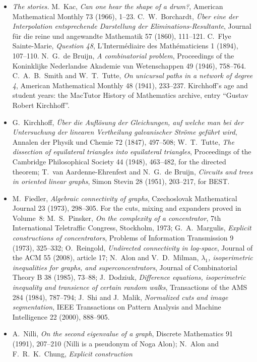 \begin{itemize}
\item \emph{The stories.} M.~Kac, \emph{Can one hear the shape of a drum?}, American Mathematical Monthly 73 (1966), 1--23. C.~W.~Borchardt, \emph{\"Uber eine der Interpolation entsprechende Darstellung der Eliminations-Resultante}, Journal f\"ur die reine und angewandte Mathematik 57 (1860), 111--121. C.~Flye Sainte-Marie, \emph{Question 48}, L'Interm\'ediaire des Math\'ematiciens 1 (1894), 107--110. N.~G.~de Bruijn, \emph{A combinatorial problem}, Proceedings of the Koninklijke Nederlandse Akademie van Wetenschappen 49 (1946), 758--764. C.~A.~B.~Smith and W.~T.~Tutte, \emph{On unicursal paths in a network of degree 4}, American Mathematical Monthly 48 (1941), 233--237. Kirchhoff's age and student years: the MacTutor History of Mathematics archive, entry ``Gustav Robert Kirchhoff''.
\item G.~Kirchhoff, \emph{\"Uber die Aufl\"osung der Gleichungen, auf welche man bei der Untersuchung der linearen Vertheilung galvanischer Str\"ome gef\"uhrt wird}, Annalen der Physik
und Chemie 72 (1847), 497--508; W.~T.~Tutte, \emph{The dissection of equilateral triangles into equilateral triangles}, Proceedings of the Cambridge Philosophical Society 44 (1948),
463--482, for the directed theorem; T.~van Aardenne-Ehrenfest and N.~G.~de Bruijn, \emph{Circuits and trees in oriented linear graphs}, Simon Stevin 28 (1951), 203--217, for BEST.
\item M.~Fiedler, \emph{Algebraic connectivity of graphs}, Czechoslovak Mathematical Journal 23 (1973), 298--305. For the cuts, mixing and expanders proved in Volume~8: M.~S.~Pinsker, \emph{On the complexity of a concentrator}, 7th International Teletraffic Congress, Stockholm, 1973; G.~A.~Margulis, \emph{Explicit constructions of
concentrators}, Problems of Information Transmission 9 (1973), 325--332; O.~Reingold, \emph{Undirected connectivity in log-space}, Journal of the ACM 55 (2008), article 17; N.~Alon and V.~D.~Milman, \emph{$\lambda_1$, isoperimetric inequalities for graphs, and
superconcentrators}, Journal of Combinatorial Theory B 38 (1985), 73--88; J.~Dodziuk, \emph{Difference equations, isoperimetric inequality and transience of certain random walks}, Transactions
of the AMS 284 (1984), 787--794; J.~Shi and J.~Malik, \emph{Normalized cuts and image segmentation}, IEEE Transactions on Pattern Analysis and Machine Intelligence 22 (2000), 888--905.
\item A.~Nilli, \emph{On the second eigenvalue of a graph}, Discrete Mathematics 91 (1991), 207--210 (Nilli is a pseudonym of Noga Alon); N.~Alon and F.~R.~K.~Chung, \emph{Explicit construction
}
\end{itemize}
